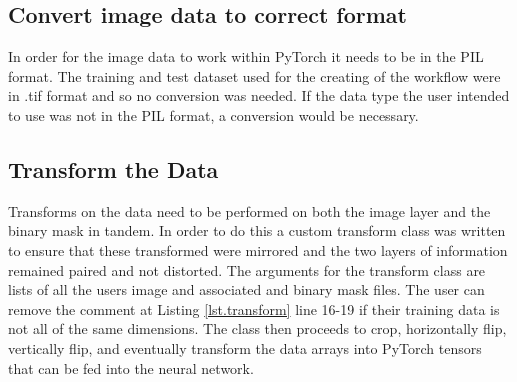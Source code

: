 \subsection{Convert image data to correct format}
In order for the image data to work within PyTorch it needs to be in the PIL format. The training and test dataset used for the creating of the workflow were in .tif format and so no conversion was needed. If the data type the user intended to use was not in the PIL format, a conversion would be necessary.
\subsection{Transform the Data}
Transforms on the data need to be performed on both the image layer and the binary mask in tandem. In order to do this a custom transform class was written to ensure that these transformed were mirrored and the two layers of information remained paired and not distorted.
The arguments for the transform class are lists of all the users image and associated and binary mask files. The user can remove the comment at Listing \ref{lst.transform} line 16-19 if their training data is not all of the same dimensions. The class then proceeds to crop, horizontally flip, vertically flip, and eventually transform the data arrays into PyTorch tensors that can be fed into the neural network. \par 
